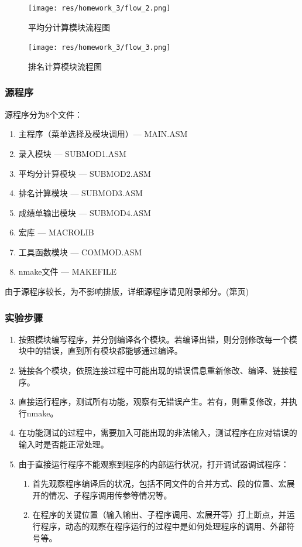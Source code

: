 \documentclass{article}
\begin{document}
	\begin{figure}[H]
		\centering
		\texttt{[image: res/homework\_3/flow\_2.png]}
		\caption{平均分计算模块流程图}
		\label{fig:flow2}
	\end{figure}

	\begin{figure}[H]
		\centering
		\texttt{[image: res/homework\_3/flow\_3.png]}
		\caption{排名计算模块流程图}
		\label{fig:flow3}
	\end{figure}

	\subsubsection{源程序}
	源程序分为8个文件：
	\begin{enumerate}
		\item 主程序（菜单选择及模块调用）--- MAIN.ASM
		\item 录入模块 --- SUBMOD1.ASM
		\item 平均分计算模块 --- SUBMOD2.ASM
		\item 排名计算模块 --- SUBMOD3.ASM
		\item 成绩单输出模块 --- SUBMOD4.ASM
		\item 宏库 --- MACROLIB
		\item 工具函数模块 --- COMMOD.ASM
		\item nmake文件 --- MAKEFILE
	\end{enumerate}
	由于源程序较长，为不影响排版，详细源程序请见附录部分。(第\pageref{code:3_1}页)

	\subsubsection{实验步骤}
	\begin{enumerate}
		\item 按照模块编写程序，并分别编译各个模块。若编译出错，则分别修改每一个模块中的错误，直到所有模块都能够通过编译。
		\item 链接各个模块，依照连接过程中可能出现的错误信息重新修改、编译、链接程序。
		\item 直接运行程序，测试所有功能，观察有无错误产生。若有，则重复修改，并执行nmake。
		\item 在功能测试的过程中，需要加入可能出现的非法输入，测试程序在应对错误的输入时是否能正常处理。
		\item 由于直接运行程序不能观察到程序的内部运行状况，打开调试器调试程序：
		\begin{enumerate}
			\item 首先观察程序编译后的状况，包括不同文件的合并方式、段的位置、宏展开的情况、子程序调用传参等情况等。
			\item 在程序的关键位置（输入输出、子程序调用、宏展开等）打上断点，并运行程序，动态的观察在程序运行的过程中是如何处理程序的调用、外部符号等。
		\end{enumerate}
	\end{enumerate}
\end{document}

